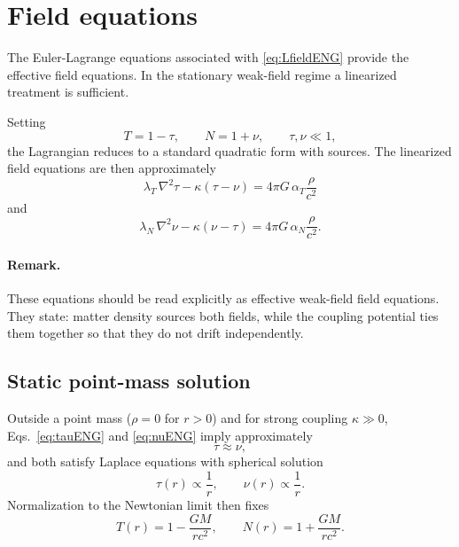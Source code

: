 \documentclass[11pt,a4paper]{article}
\begin{document}
\section{Field equations}
The Euler-Lagrange equations associated with \eqref{eq:LfieldENG} provide the effective field equations. In the stationary weak-field regime a linearized treatment is sufficient.

Setting
\begin{equation}
 T = 1-\tau, \qquad N = 1+\nu,
 \qquad \tau,\nu \ll 1,
\end{equation}
the Lagrangian reduces to a standard quadratic form with sources. The linearized field equations are then approximately
\begin{equation}
\boxed{
\lambda_T\,\nabla^2 \tau - \kappa(\tau-\nu)= 4\pi G\,\alpha_T \frac{\rho}{c^2}
}
\label{eq:tauENG}
\end{equation}
and
\begin{equation}
\boxed{
\lambda_N\,\nabla^2 \nu - \kappa(\nu-\tau)= 4\pi G\,\alpha_N \frac{\rho}{c^2}.
}
\label{eq:nuENG}
\end{equation}

\paragraph{Remark.}
These equations should be read explicitly as effective weak-field field equations. They state: matter density sources both fields, while the coupling potential ties them together so that they do not drift independently.

\subsection{Static point-mass solution}
Outside a point mass ($\rho=0$ for $r>0$) and for strong coupling $\kappa\gg0$, Eqs.~\eqref{eq:tauENG} and \eqref{eq:nuENG} imply approximately
\begin{equation}
 \tau \approx \nu,
\end{equation}
and both satisfy Laplace equations with spherical solution
\begin{equation}
 \tau(r) \propto \frac{1}{r},
 \qquad
 \nu(r) \propto \frac{1}{r}.
\end{equation}
Normalization to the Newtonian limit then fixes
\begin{equation}
\boxed{
T(r)=1-\frac{GM}{rc^2},
\qquad
N(r)=1+\frac{GM}{rc^2}.
}
\label{eq:TNENG}
\end{equation}
\end{document}
